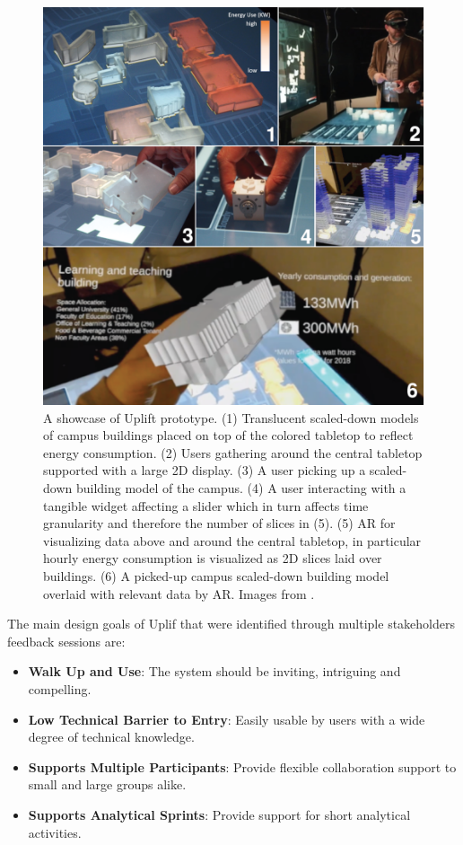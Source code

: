 \documentclass{vgtc}                          %
\begin{document}
\begin{figure}[tb]
	\centering
	\includegraphics[width=\columnwidth]{uplift}
	\caption[Caption for Uplift]{A showcase of Uplift prototype. (1)
		Translucent scaled-down models of campus buildings placed on top of the
		colored tabletop to reflect energy consumption. (2) Users gathering
		around the central tabletop supported with a large 2D display. (3)
		A user picking up a scaled-down building model of the campus. (4)
		A user interacting with a tangible widget affecting a slider which
		in turn affects time granularity and therefore the number of slices
		in (5). (5) AR for visualizing data above and around the central
		tabletop, in particular hourly energy consumption is visualized as 2D
		slices laid over buildings. (6) A picked-up campus scaled-down building
		model overlaid with relevant data by AR.
		Images from \cite{uplift_prototype}.}
	\label{fig:uplift}
\end{figure}

\medskip

\noindent The main design goals of Uplif that were identified through multiple
stakeholders feedback sessions are:
\begin{itemize}
	\item \textbf{Walk Up and Use}: The system should be inviting, intriguing and
	      compelling.
	\item \textbf{Low Technical Barrier to Entry}: Easily usable by users with a wide
	      degree of technical knowledge.
	\item \textbf{Supports Multiple Participants}: Provide flexible collaboration
	      support to small and large groups alike.
	\item \textbf{Supports Analytical Sprints}: Provide support for short analytical
	      activities.
\end{itemize}
\end{document}
